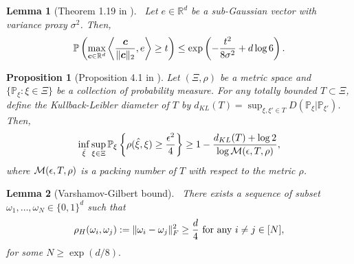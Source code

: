\documentclass[12pt]{article}
\newtheorem{lem}{Lemma}
\newtheorem{prop}{Proposition}
\theoremstyle{definition}
\begin{document}
\begin{lem}[Theorem 1.19 in \citet{phillippek2016}]~\label{lem:subga} Let $e\in\mathbb{R}^d$ be a sub-Gaussian vector with variance proxy $\sigma^2$. Then, 
\begin{align}
    \mathbb{P}\left(\max_{\bm{c}\in\mathbb{R}^d}\left\langle \frac{\bm{c}}{\|\bm{c}\|_2}, e\right\rangle\geq t\right)\leq \exp\left(-\frac{t^2}{8\sigma^2}+d\log 6\right).
\end{align}

\end{lem}

\begin{prop}[Proposition 4.1 in \citet{gao2015rate}]\label{prop:minmax}
Let $(\Xi,\rho)$ be a metric space and $\{\mathbb{P}_\xi\colon\xi\in\Xi\}$ be a collection of probability measure. For any totally bounded $T\subset\Xi$, define the Kullback-Leibler diameter of $T$ by $d_{KL}(T) = \sup_{\xi,\xi'\in T}D(\mathbb{P}_{\xi}|\mathbb{P}_{\xi'})$. Then,
\begin{align}
    \inf_{\hat\xi}\sup_{\xi\in\Xi}\mathbb{P}_\xi\left\{\rho(\hat\xi,\xi)\geq \frac{\epsilon^2}{4}\right\}\geq 1-\frac{d_{KL}(T)+\log 2}{\log \mathcal{M}(\epsilon,T,\rho)},
\end{align}
where $\mathcal{M}(\epsilon,T,\rho)$ is a packing number of $T$ with  respect to the metric $\rho$.
\end{prop}



\begin{lem}[Varshamov-Gilbert bound]~\label{lem:covering} There exists a sequence of subset $\omega_1,\ldots,\omega_N\in\{0,1\}^d$ such that 
\begin{align}
    \rho_H(\omega_i,\omega_j):= \lVert\omega_i-\omega_j\rVert_F^2 \geq \frac{d}{4} \text{ for any } i\neq j\in[N],
\end{align}
for some $N\geq \exp(d/8).$
\end{lem}
\end{document}
